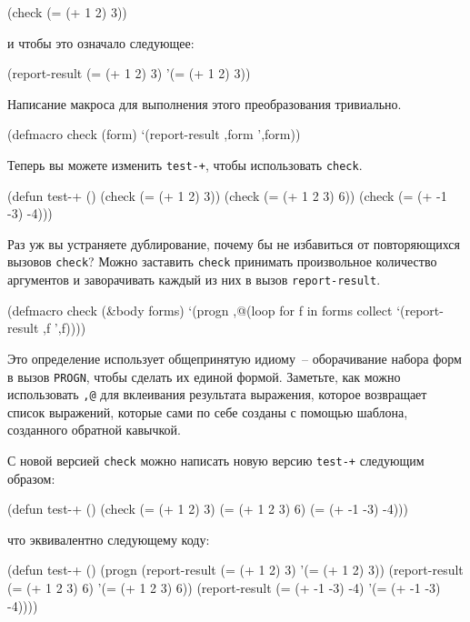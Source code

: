 \begin{myverb}
(check (= (+ 1 2) 3))
\end{myverb}

\noindent{}и чтобы это означало следующее:

\begin{myverb}
(report-result (= (+ 1 2) 3) '(= (+ 1 2) 3))
\end{myverb}

Написание макроса для выполнения этого преобразования тривиально.

\begin{myverb}
(defmacro check (form)
  `(report-result ,form ',form))
\end{myverb}

Теперь вы можете изменить \lstinline{test-+}, чтобы использовать \lstinline{check}.

\begin{myverb}
(defun test-+ ()
  (check (= (+ 1 2) 3))
  (check (= (+ 1 2 3) 6))
  (check (= (+ -1 -3) -4)))
\end{myverb}

Раз уж вы устраняете дублирование, почему бы не избавиться от повторяющихся вызовов
\lstinline{check}? Можно заставить \lstinline{check} принимать произвольное количество аргументов и
заворачивать каждый из них в вызов \lstinline{report-result}.

\begin{myverb}
(defmacro check (&body forms)
  `(progn
     ,@(loop for f in forms collect `(report-result ,f ',f))))
\end{myverb}

Это определение использует общепринятую идиому~-- оборачивание набора форм в вызов
\lstinline{PROGN}, чтобы сделать их единой формой. Заметьте, как можно использовать \lstinline{,@}
для вклеивания результата выражения, которое возвращает список выражений, которые сами по
себе созданы с помощью шаблона, созданного обратной кавычкой.

С новой версией \lstinline{check} можно написать новую версию \lstinline{test-+} следующим образом:

\begin{myverb}
(defun test-+ ()
  (check
    (= (+ 1 2) 3)
    (= (+ 1 2 3) 6)
    (= (+ -1 -3) -4)))
\end{myverb}

\noindent{}что эквивалентно следующему коду:

\begin{myverb}
(defun test-+ ()
  (progn
    (report-result (= (+ 1 2) 3) '(= (+ 1 2) 3))
    (report-result (= (+ 1 2 3) 6) '(= (+ 1 2 3) 6))
    (report-result (= (+ -1 -3) -4) '(= (+ -1 -3) -4))))
\end{myverb}

